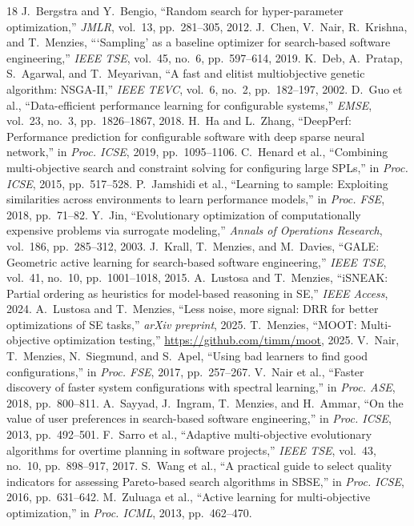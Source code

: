 \documentclass[conference]{IEEEtran}
\begin{document}
\begin{thebibliography}{18}
 J.~Bergstra and Y.~Bengio, ``Random search for hyper-parameter optimization,'' \emph{JMLR}, vol.~13, pp.~281--305, 2012.
 J.~Chen, V.~Nair, R.~Krishna, and T.~Menzies, ```Sampling' as a baseline optimizer for search-based software engineering,'' \emph{IEEE TSE}, vol.~45, no.~6, pp.~597--614, 2019.
 K.~Deb, A.~Pratap, S.~Agarwal, and T.~Meyarivan, ``A fast and elitist multiobjective genetic algorithm: NSGA-II,'' \emph{IEEE TEVC}, vol.~6, no.~2, pp.~182--197, 2002.
 D.~Guo et al., ``Data-efficient performance learning for configurable systems,'' \emph{EMSE}, vol.~23, no.~3, pp.~1826--1867, 2018.
 H.~Ha and L.~Zhang, ``DeepPerf: Performance prediction for configurable software with deep sparse neural network,'' in \emph{Proc. ICSE}, 2019, pp.~1095--1106.
 C.~Henard et al., ``Combining multi-objective search and constraint solving for configuring large SPLs,'' in \emph{Proc. ICSE}, 2015, pp.~517--528.
 P.~Jamshidi et al., ``Learning to sample: Exploiting similarities across environments to learn performance models,'' in \emph{Proc. FSE}, 2018, pp.~71--82.
 Y.~Jin, ``Evolutionary optimization of computationally expensive problems via surrogate modeling,'' \emph{Annals of Operations Research}, vol.~186, pp.~285--312, 2003.
 J.~Krall, T.~Menzies, and M.~Davies, ``GALE: Geometric active learning for search-based software engineering,'' \emph{IEEE TSE}, vol.~41, no.~10, pp.~1001--1018, 2015.
 A.~Lustosa and T.~Menzies, ``iSNEAK: Partial ordering as heuristics for model-based reasoning in SE,'' \emph{IEEE Access}, 2024.
 A.~Lustosa and T.~Menzies, ``Less noise, more signal: DRR for better optimizations of SE tasks,'' \emph{arXiv preprint}, 2025.
 T.~Menzies, ``MOOT: Multi-objective optimization testing,'' \url{https://github.com/timm/moot}, 2025.
 V.~Nair, T.~Menzies, N.~Siegmund, and S.~Apel, ``Using bad learners to find good configurations,'' in \emph{Proc. FSE}, 2017, pp.~257--267.
 V.~Nair et al., ``Faster discovery of faster system configurations with spectral learning,'' in \emph{Proc. ASE}, 2018, pp.~800--811.
 A.~Sayyad, J.~Ingram, T.~Menzies, and H.~Ammar, ``On the value of user preferences in search-based software engineering,'' in \emph{Proc. ICSE}, 2013, pp.~492--501.
 F.~Sarro et al., ``Adaptive multi-objective evolutionary algorithms for overtime planning in software projects,'' \emph{IEEE TSE}, vol.~43, no.~10, pp.~898--917, 2017.
 S.~Wang et al., ``A practical guide to select quality indicators for assessing Pareto-based search algorithms in SBSE,'' in \emph{Proc. ICSE}, 2016, pp.~631--642.
 M.~Zuluaga et al., ``Active learning for multi-objective optimization,'' in \emph{Proc. ICML}, 2013, pp.~462--470.
\end{thebibliography}
\end{document}
